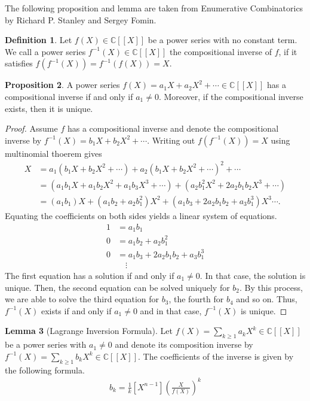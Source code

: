 \documentclass[a4paper]{article}
\theoremstyle{definition}
\newtheorem{definition}{Definition}[]
\newtheorem{lemma}[definition]{Lemma}
\newtheorem{proposition}[definition]{Proposition}
\begin{document}
The following proposition and lemma are taken from Enumerative Combinatorics by Richard P. Stanley and Sergey Fomin.

\begin{definition}
    Let \(f(X) \in \mathbb{C}[[X]]\) be a power series with no constant term. We call a power series \(f^{-1}(X) \in \mathbb{C}[[X]]\) the compositional inverse of \(f\), if it satisfies \(f(f^{-1}(X)) = f^{-1}(f(X)) = X\). 
\end{definition}
\begin{proposition}
    A power series \(f(X) = a_1 X + a_2 X^2 + \cdots\in \mathbb{C}[[X]]\) has a compositional inverse if and only if \(a_1 \neq 0\). Moreover, if the compositional inverse exists, then it is unique. 
\end{proposition}
\begin{proof}
    Assume \(f\) has a compositional inverse and denote the compositional inverse by \(f^{-1}(X) = b_1 X + b_2 X^2 + \cdots\). Writing out \(f(f^{-1}(X)) = X\) using multinomial thoerem gives
    \begin{align*}
        X &= a_1 (b_1 X + b_2 X^2 + \cdots) + a_2 (b_1 X + b_2 X^2 + \cdots)^2 + \cdots \\
        &= (a_1 b_1 X + a_1 b_2 X^2 + a_1 b_3 X^3 + \cdots) + (a_2 b_1^2 X^2 + 2 a_2 b_1 b_2 X^3 + \cdots) \\
        &= (a_1 b_1) X + (a_1 b_2 + a_2 b_1^2) X^2 + (a_1b_3 + 2 a_2 b_1 b_2 + a_3 b_1^3) X^3 \cdots\text{.}
    \end{align*}
    Equating the coefficients on both sides yields a linear system of equations.
    \begin{align*}
        1 &= a_1 b_1 \\
        0 &= a_1 b_2 + a_2 b_1^2 \\
        0 &= a_1b_3 + 2 a_2 b_1 b_2 + a_3 b_1^3 \\
        & \quad\vdots
    \end{align*}
    The first equation has a solution if and only if \(a_1 \neq 0\). In that case, the solution is unique. Then, the second equation can be solved uniquely for \(b_2\). By this process, we are able to solve the third equation for \(b_3\), the fourth for \(b_4\) and so on. Thus, \(f^{-1}(X)\) exists if and only if \(a_1 \neq 0\) and in that case, \(f^{-1}(X)\) is unique.
\end{proof}
\begin{lemma}[Lagrange Inversion Formula]
    Let \(f(X) = \sum_{k \geq 1} a_k X^k \in \mathbb{C}[[X]]\) be a power series with \(a_1 \neq 0\) and denote its composition inverse by \(f^{-1}(X) = \sum_{k \geq 1}b_k X^k \in \mathbb{C}[[X]]\). The coefficients of the inverse is given by the following formula.
    \begin{align*}
        b_k = \frac{1}{k} [X^{n - 1}] \left(\frac{X}{f(X)}\right)^k
    \end{align*}
\end{lemma}
\end{document}
